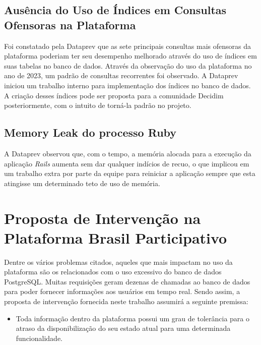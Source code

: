 \subsection{Ausência do Uso de Índices em Consultas Ofensoras na Plataforma}

Foi constatado pela Dataprev que as sete principais consultas mais ofensoras da plataforma poderiam ter seu desempenho melhorado através do uso de índices em suas tabelas no banco de dados. Através da observação do uso da plataforma no ano de 2023, um padrão de consultas recorrentes foi observado. A Dataprev iniciou um trabalho interno para implementação dos índices no banco de dados. A criação desses índices pode ser proposta para a comunidade Decidim posteriormente, com o intuito de torná-la padrão no projeto.

\subsection{Memory Leak do processo Ruby}

A Dataprev observou que, com o tempo, a memória alocada para a execução da aplicação \textit{Rails} aumenta sem dar qualquer indícios de recuo, o que implicou em um trabalho extra por parte da equipe para reiniciar a aplicação sempre que esta atingisse um determinado teto de uso de memória.

\section{Proposta de Intervenção na Plataforma Brasil Participativo}
\label{sec:proposta_de_intervencao_na_plataforma_brasil_participativo}

Dentre os vários problemas citados, aqueles que mais impactam no uso da plataforma são os relacionados com o uso excessivo do banco de dados PostgreSQL. Muitas requisições geram dezenas de chamadas ao banco de dados para poder fornecer informações aos usuários em tempo real. Sendo assim, a proposta de intervenção fornecida neste trabalho assumirá a seguinte premissa:

\begin{itemize}
    \item Toda informação dentro da plataforma possui um grau de tolerância para o atraso da disponibilização do seu estado atual para uma determinada funcionalidade.
\end{itemize}

